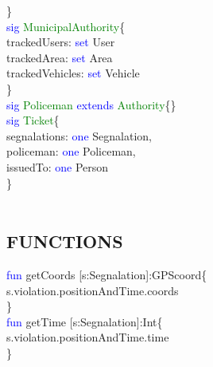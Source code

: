 \} \\
\textcolor{blue}{sig}
\textcolor{green}{MunicipalAuthority}\{\\
trackedUsers: \textcolor{blue}{set} User\\
trackedArea: \textcolor{blue}{set} Area\\
trackedVehicles: \textcolor{blue}{set} Vehicle\\
\} \\
\textcolor{blue}{sig}
\textcolor{green}{Policeman}
\textcolor{blue}{extends}
\textcolor{green}{Authority}\{\}\\
\textcolor{blue}{sig}
\textcolor{green}{Ticket}\{ \\
segnalations: \textcolor{blue}{one} Segnalation,\\
policeman: \textcolor{blue}{one} Policeman,\\
issuedTo: \textcolor{blue}{one} Person\\
\}\\
\\
\subsection{FUNCTIONS}
\textcolor{blue}{fun}
\textcolor{mycolor}{getCoords} [s:Segnalation]:GPScoord\{\\
s.violation.positionAndTime.coords\\
\}\\
\textcolor{blue}{fun}
\textcolor{mycolor}{getTime} [s:Segnalation]:Int\{\\
s.violation.positionAndTime.time\\
\}\\
\\
